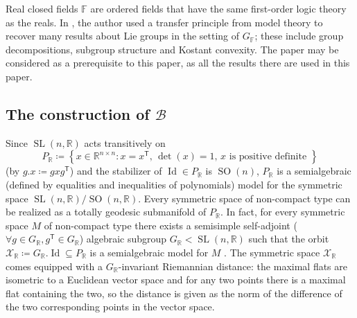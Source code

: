 \documentclass[12pt]{amsart}
\newcommand{\F}{\mathbb{F} }
\newcommand{\R}{\mathbb{R} }
\newcommand{\X}{\mathcal{X}}
\newcommand{\B}{\mathcal{B}}
\newcommand{\tran}{{^{\mathsf{T}}\!}}
\numberwithin{equation}{section}
\theoremstyle{remark} %
\begin{document}
Real closed fields $\F$ are ordered fields that have the same first-order logic theory as the reals. In \cite{AppAGRCF}, the author used a transfer principle from model theory to recover many results about Lie groups in the setting of $G_{\F}$; these include group decompositions, subgroup structure and Kostant convexity. The paper \cite{AppAGRCF} may be considered as a prerequisite to this paper, as all the results there are used in this paper.


\subsection{The construction of \texorpdfstring{$\B$}{B}}
Since $\operatorname{SL}(n,\R)$ acts transitively on 
$$
P_\R \coloneq \left\{ x \in \mathbb{R}^{n\times n} \colon x = x\tran , \, \det(x)=1 , \, x \text{ is positive definite } \right\}
$$
(by $g.x \coloneq gxg\tran$) and the stabilizer of $\operatorname{Id} \in P_\R$ is $\operatorname{SO}(n)$, $P_\R$ is a semialgebraic (defined by equalities and inequalities of polynomials) model for the symmetric space $\operatorname{SL}(n,\R)/\operatorname{SO}(n,\R)$. 
Every symmetric space of non-compact type can be realized as a totally geodesic submanifold of $P_\R$. In fact, for every symmetric space $M$ of non-compact type there exists a semisimple self-adjoint ($\forall g \in G_\R, g\tran \in G_\R$) algebraic subgroup $G_\R <\operatorname{SL}(n,\R)$ such that the orbit $\X_\R \coloneq G_\R .\operatorname{Id} \subseteq P_\R$ is a semialgebraic model for $M$ \cite[Theorem 2.6.5]{Ebe}. The symmetric space $\X_\R$ comes equipped with a $G_\R$-invariant Riemannian distance: the maximal flats are isometric to a Euclidean vector space and for any two points there is a maximal flat containing the two, so the distance is given as the norm of the difference of the two corresponding points in the vector space.
\end{document}
